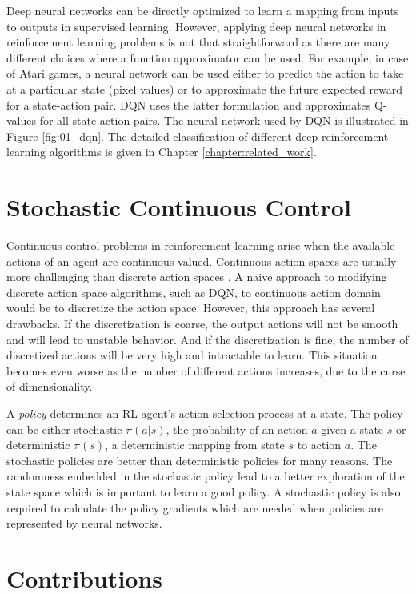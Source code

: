 Deep neural networks can be directly optimized to learn a mapping from inputs to outputs in supervised learning. However, applying deep neural networks in reinforcement learning problems is not that straightforward as there are many different choices where a function approximator can be used. For example, in case of Atari games, a neural network can be used either to predict the action to take at a particular state (pixel values) or to approximate the future expected reward for a state-action pair. DQN uses the latter formulation and approximates Q-values for all state-action pairs. The neural network used by DQN is illustrated in Figure \ref{fig:01_dqn}. The detailed classification of different deep reinforcement learning algorithms is given in Chapter \ref{chapter:related_work}.

\section{Stochastic Continuous Control}
Continuous control problems in reinforcement learning arise when the available actions of an agent are continuous valued. Continuous action spaces are usually more challenging than discrete action spaces \cite{ddpg}. A naive approach to modifying discrete action space algorithms, such as DQN, to continuous action domain would be to discretize the action space. However, this approach has several drawbacks. If the discretization is coarse, the output actions will not be smooth and will lead to unstable behavior. And if the discretization is fine, the number of discretized actions will be very high and intractable to learn. This situation becomes even worse as the number of different actions increases, due to the curse of dimensionality.

A \textit{policy} determines an RL agent's action selection process at a state. The policy can be either stochastic $\pi(a|s)$, the probability of an action $a$ given a state $s$ or deterministic $\pi(s)$, a deterministic mapping from state $s$ to action $a$. The stochastic policies are better than deterministic policies for many reasons. The randomness embedded in the stochastic policy lead to a better exploration of the state space which is important to learn a good policy. A stochastic policy is also required to calculate the policy gradients which are needed when policies are represented by neural networks.


\section{Contributions}


